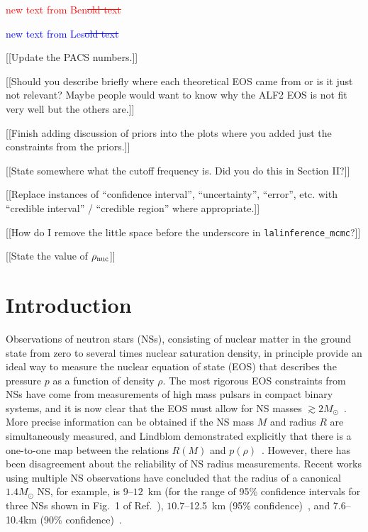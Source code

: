 \documentclass[twocolumn,prd,amssymb,aps,nofootinbib,showpacs,epsf]{revtex4}
\newcommand\ben[2]{\textcolor{red}{{#1}\sout{#2}}}
\newcommand\les[2]{\textcolor{blue}{{#1}\sout{#2}}}
\begin{document}
\ben{new text from Ben}{old text}

\les{new text from Les}{old text}

[[Update the PACS numbers.]]

[[Should you describe briefly where each theoretical EOS came from or is it just not relevant? Maybe people would want to know why the ALF2 EOS is not fit very well but the others are.]]

[[Finish adding discussion of priors into the plots where you added just the constraints from the priors.]]

[[State somewhere what the cutoff frequency is. Did you do this in Section II?]]

[[Replace instances of ``confidence interval'', ``uncertainty'', ``error'', etc. with ``credible interval'' / ``credible region'' where appropriate.]]

[[How do I remove the little space before the underscore in \texttt{lalinference\_mcmc}?]]

[[State the value of $\rho_{\rm nuc}$]]

\section{Introduction}

Observations of neutron stars (NSs), consisting of nuclear matter in the ground state from zero to several times nuclear saturation density, in principle provide an ideal way to measure the nuclear equation of state (EOS) that describes the pressure $p$ as a function of density $\rho$. The most rigorous EOS constraints from NSs have come from measurements of high mass pulsars in compact binary systems, and it is now clear that the EOS must allow for NS masses $\gtrsim 2 M_\odot$~\cite{DemorestPennucciRansom2010, AntoniadisFreireWex2013}. More precise information can be obtained if the NS mass $M$ and radius $R$ are simultaneously measured, and Lindblom demonstrated explicitly that there is a one-to-one map between the relations $R(M)$ and $p(\rho)$~\cite{Lindblom1992}. However, there has been disagreement about the reliability of NS radius measurements. Recent works using multiple NS observations have concluded that the radius of a canonical $1.4M_\odot$ NS, for example, is $9$--$12$~km (for the range of 95\% confidence intervals for three NSs shown in Fig.~1 of Ref.~\cite{OzelBaymGuver2010}), $10.7$--12.5~km (95\% confidence)~\cite{SteinerLattimerBrown2010}, and 7.6--10.4km (90\% confidence)~\cite{GuillotServillatWebb2013}.
\end{document}
